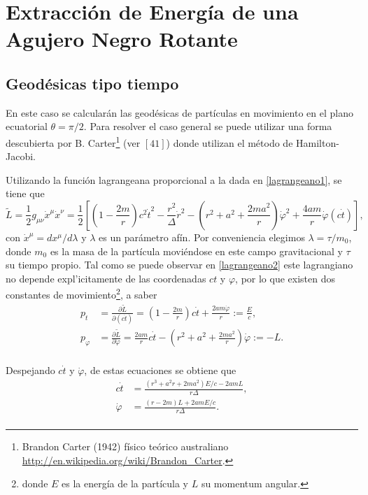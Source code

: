 \section{Extracci\'on de Energ\'ia de una Agujero Negro Rotante}

\subsection{Geod\'esicas tipo tiempo}

En este caso se calcular\'an las geod\'esicas de part\'iculas en movimiento en el plano ecuatorial $\theta=\pi/2$. Para resolver el caso general se puede utilizar una forma descubierta por B. Carter\footnote{Brandon Carter (1942) f\'isico te\'orico australiano \url{http://en.wikipedia.org/wiki/Brandon_Carter}.} (ver $[41]$) donde utilizan el m\'etodo de Hamilton-Jacobi.

Utilizando la funci\'on lagrangeana proporcional a la dada en \eqref{lagrangeano1}, se tiene que
\begin{equation}\label{lagrangeano2}
\tilde{L}=\frac{1}{2}g_{\mu \nu} \dot{x}^{\mu} \dot{x}^{\nu}=\frac{1}{2}\left[\left(1-\frac{2m}{r}\right)c^2\dot{t}^2-\frac{r^2}{\Delta}\dot{r}^2-\left(r^2+a^2+\frac{2ma^2}{r}\right)\dot{\varphi}^2
+\frac{4am}{r}\dot{\varphi}(c\dot{t}) \right],
\end{equation}
con $\dot{x}^{\mu}=dx^{\mu}/d \lambda$ y $\lambda$ es un par\'ametro af\'in. Por conveniencia elegimos $\lambda=\tau/m_0$, donde $m_0$ es la masa de la part\'icula movi\'endose en este campo gravitacional y $\tau$ su tiempo propio. Tal como se puede observar en \eqref{lagrangeano2} este lagrangiano no depende expl'icitamente de las coordenadas $ct$ y $\varphi$, por lo que existen dos constantes de movimiento\footnote{donde $E$ es la energ\'ia de la part\'icula y $L$ su momentum angular.}, a saber
\begin{equation}
\begin{aligned}
p_{t}&=\frac{\partial \tilde{L}}{\partial(c\dot{t})}=\left(1-\frac{2m}{r}\right)c\dot{t}+\frac{2am\dot{\varphi}}{r}:=\frac{E}{c},\\ 
p_{\varphi}&=\frac{\partial \tilde{L}}{\partial \dot{\varphi}}=\frac{2am}{r}c\dot{t}-\left(r^2+a^2+\frac{2ma^2}{r}\right)\dot{\varphi}:=-L.\\
\end{aligned}
\end{equation}

Despejando $c\dot{t}$ y $\dot{\varphi}$, de estas ecuaciones se obtiene que
\begin{equation}
\begin{aligned}
c\dot{t}&=\frac{(r^3+a^2r+2ma^2)E/c-2amL}{r\Delta},\\ \label{dottdotphi}
\dot{\varphi}&=\frac{(r-2m)L+2amE/c}{r\Delta}.\\
\end{aligned}
\end{equation}

